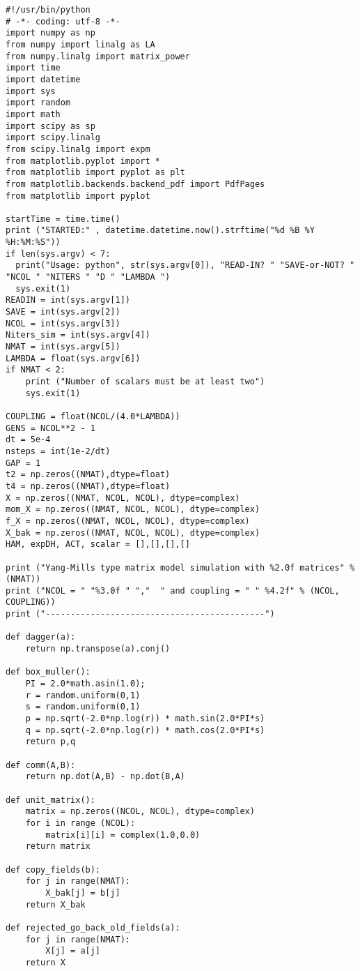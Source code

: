 \begin{lstlisting}
#!/usr/bin/python
# -*- coding: utf-8 -*-
import numpy as np
from numpy import linalg as LA
from numpy.linalg import matrix_power
import time 
import datetime 
import sys
import random
import math
import scipy as sp
import scipy.linalg
from scipy.linalg import expm
from matplotlib.pyplot import *
from matplotlib import pyplot as plt
from matplotlib.backends.backend_pdf import PdfPages
from matplotlib import pyplot

startTime = time.time()
print ("STARTED:" , datetime.datetime.now().strftime("%d %B %Y %H:%M:%S"))
if len(sys.argv) < 7:
  print("Usage: python", str(sys.argv[0]), "READ-IN? " "SAVE-or-NOT? " "NCOL " "NITERS " "D " "LAMBDA ")
  sys.exit(1)
READIN = int(sys.argv[1])
SAVE = int(sys.argv[2])
NCOL = int(sys.argv[3]) 
Niters_sim = int(sys.argv[4]) 
NMAT = int(sys.argv[5])
LAMBDA = float(sys.argv[6])
if NMAT < 2:
    print ("Number of scalars must be at least two")
    sys.exit(1) 

COUPLING = float(NCOL/(4.0*LAMBDA))
GENS = NCOL**2 - 1
dt = 5e-4
nsteps = int(1e-2/dt)
GAP = 1
t2 = np.zeros((NMAT),dtype=float)
t4 = np.zeros((NMAT),dtype=float)
X = np.zeros((NMAT, NCOL, NCOL), dtype=complex)
mom_X = np.zeros((NMAT, NCOL, NCOL), dtype=complex)
f_X = np.zeros((NMAT, NCOL, NCOL), dtype=complex)
X_bak = np.zeros((NMAT, NCOL, NCOL), dtype=complex)
HAM, expDH, ACT, scalar = [],[],[],[]

print ("Yang-Mills type matrix model simulation with %2.0f matrices" % (NMAT)) 
print ("NCOL = " "%3.0f " ","  " and coupling = " " %4.2f" % (NCOL, COUPLING)) 
print ("--------------------------------------------")

def dagger(a):
    return np.transpose(a).conj()

def box_muller():
    PI = 2.0*math.asin(1.0);    
    r = random.uniform(0,1)
    s = random.uniform(0,1)
    p = np.sqrt(-2.0*np.log(r)) * math.sin(2.0*PI*s)
    q = np.sqrt(-2.0*np.log(r)) * math.cos(2.0*PI*s)
    return p,q

def comm(A,B):
    return np.dot(A,B) - np.dot(B,A)

def unit_matrix():
    matrix = np.zeros((NCOL, NCOL), dtype=complex)
    for i in range (NCOL):
        matrix[i][i] = complex(1.0,0.0)
    return matrix

def copy_fields(b):
    for j in range(NMAT):
        X_bak[j] = b[j]
    return X_bak

def rejected_go_back_old_fields(a):
    for j in range(NMAT):
        X[j] = a[j]
    return X


\end{lstlisting}
